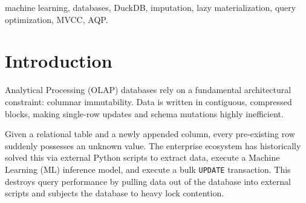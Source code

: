 \documentclass[conference]{IEEEtran}
\begin{document}
\begin{abstract}
When a schema adds a new column to a table with pre-existing rows, historical records lack a corresponding value. Standard data engineering mandates leaving these rows as NULL, populating them with static defaults, or executing computationally expensive full-table backfills using external machine learning (ML) middleware. We propose a systems-architecture alternative: Deferred Columns. We compute missing values dynamically on demand, utilizing a lightweight ML model integrated directly into the database engine. By hooking into DuckDB's \texttt{TableFunction} and \texttt{OptimizerExtension}, we demonstrate the lazy materialization of ML columns. Furthermore, we address two critical challenges for in-database ML: Multi-Version Concurrency Control for ML Models (MVCC-M) for deterministic reads, and Approximate Query Processing (AQP) to provide statistical confidence intervals over the imputed data. We validate the systems throughput using tests spanning 10 million rows, proving that Deferred Columns avoids the upfront serialization bottleneck. Note that this paper evaluates the systems and architectural latency of the pipeline; the statistical accuracy of the underlying imputation models themselves is strictly out of scope.
\end{abstract}

\begin{IEEEkeywords}
machine learning, databases, DuckDB, imputation, lazy materialization, query optimization, MVCC, AQP.
\end{IEEEkeywords}

\section{Introduction}
 Analytical Processing (OLAP) databases rely on a fundamental architectural constraint: columnar immutability. Data is written in contiguous, compressed blocks, making single-row updates and schema mutations highly inefficient.

Given a relational table and a newly appended column, every pre-existing row suddenly possesses an unknown value. The enterprise ecosystem has historically solved this via external Python scripts to extract data, execute a Machine Learning (ML) inference model, and execute a bulk \texttt{UPDATE} transaction. This destroys query performance by pulling data out of the database into external scripts and subjects the database to heavy lock contention.
\end{document}
